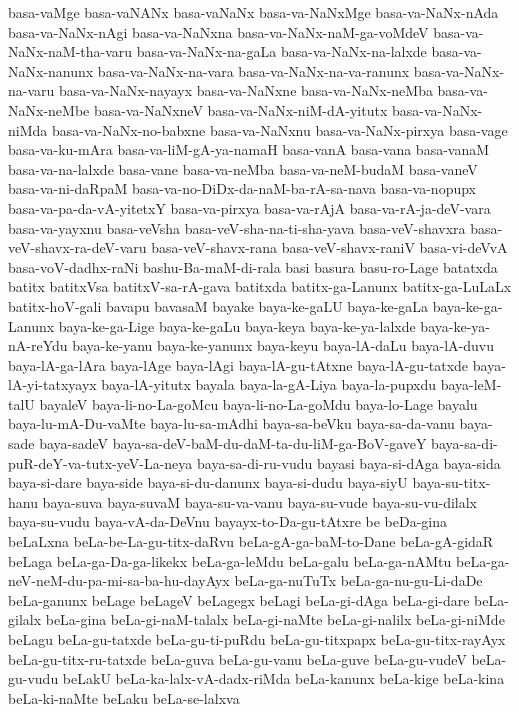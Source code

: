 {basa-vaMge
basa-vaNANx
basa-vaNaNx
basa-va-NaNxMge
basa-va-NaNx-nAda
basa-va-NaNx-nAgi
basa-va-NaNxna
basa-va-NaNx-naM-ga-voMdeV
basa-va-NaNx-naM-tha-varu
basa-va-NaNx-na-gaLa
basa-va-NaNx-na-lalxde
basa-va-NaNx-nanunx
basa-va-NaNx-na-vara
basa-va-NaNx-na-va-ranunx
basa-va-NaNx-na-varu
basa-va-NaNx-nayayx
basa-va-NaNxne
basa-va-NaNx-neMba
basa-va-NaNx-neMbe
basa-va-NaNxneV
basa-va-NaNx-niM-dA-yitutx
basa-va-NaNx-niMda
basa-va-NaNx-no-babxne
basa-va-NaNxnu
basa-va-NaNx-pirxya
basa-vage
basa-va-ku-mAra
basa-va-liM-gA-ya-namaH
basa-vanA
basa-vana
basa-vanaM
basa-va-na-lalxde
basa-vane
basa-va-neMba
basa-va-neM-budaM
basa-vaneV
basa-va-ni-daRpaM
basa-va-no-DiDx-da-naM-ba-rA-sa-nava
basa-va-nopupx
basa-va-pa-da-vA-yitetxY
basa-va-pirxya
basa-va-rAjA
basa-va-rA-ja-deV-vara
basa-va-yayxnu
basa-veVsha
basa-veV-sha-na-ti-sha-yava
basa-veV-shavxra
basa-veV-shavx-ra-deV-varu
basa-veV-shavx-rana
basa-veV-shavx-raniV
basa-vi-deVvA
basa-voV-dadhx-raNi
bashu-Ba-maM-di-rala
basi
basura
basu-ro-Lage
batatxda
batitx
batitxVsa
batitxV-sa-rA-gava
batitxda
batitx-ga-Lanunx
batitx-ga-LuLaLx
batitx-hoV-gali
bavapu
bavasaM
bayake
baya-ke-gaLU
baya-ke-gaLa
baya-ke-ga-Lanunx
baya-ke-ga-Lige
baya-ke-gaLu
baya-keya
baya-ke-ya-lalxde
baya-ke-ya-nA-reYdu
baya-ke-yanu
baya-ke-yanunx
baya-keyu
baya-lA-daLu
baya-lA-duvu
baya-lA-ga-lAra
baya-lAge
baya-lAgi
baya-lA-gu-tAtxne
baya-lA-gu-tatxde
baya-lA-yi-tatxyayx
baya-lA-yitutx
bayala
baya-la-gA-Liya
baya-la-pupxdu
baya-leM-talU
bayaleV
baya-li-no-La-goMcu
baya-li-no-La-goMdu
baya-lo-Lage
bayalu
baya-lu-mA-Du-vaMte
baya-lu-sa-mAdhi
baya-sa-beVku
baya-sa-da-vanu
baya-sade
baya-sadeV
baya-sa-deV-baM-du-daM-ta-du-liM-ga-BoV-gaveY
baya-sa-di-puR-deY-va-tutx-yeV-La-neya
baya-sa-di-ru-vudu
bayasi
baya-si-dAga
baya-sida
baya-si-dare
baya-side
baya-si-du-danunx
baya-si-dudu
baya-siyU
baya-su-titx-hanu
baya-suva
baya-suvaM
baya-su-va-vanu
baya-su-vude
baya-su-vu-dilalx
baya-su-vudu
baya-vA-da-DeVnu
bayayx-to-Da-gu-tAtxre
be
beDa-gina
beLaLxna
beLa-be-La-gu-titx-daRvu
beLa-gA-ga-baM-to-Dane
beLa-gA-gidaR
beLaga
beLa-ga-Da-ga-likekx
beLa-ga-leMdu
beLa-galu
beLa-ga-nAMtu
beLa-ga-neV-neM-du-pa-mi-sa-ba-hu-dayAyx
beLa-ga-nuTuTx
beLa-ga-nu-gu-Li-daDe
beLa-ganunx
beLage
beLageV
beLagegx
beLagi
beLa-gi-dAga
beLa-gi-dare
beLa-gilalx
beLa-gina
beLa-gi-naM-talalx
beLa-gi-naMte
beLa-gi-nalilx
beLa-gi-niMde
beLagu
beLa-gu-tatxde
beLa-gu-ti-puRdu
beLa-gu-titxpapx
beLa-gu-titx-rayAyx
beLa-gu-titx-ru-tatxde
beLa-guva
beLa-gu-vanu
beLa-guve
beLa-gu-vudeV
beLa-gu-vudu
beLakU
beLa-ka-lalx-vA-dadx-riMda
beLa-kanunx
beLa-kige
beLa-kina
beLa-ki-naMte
beLaku
beLa-se-lalxva
}
